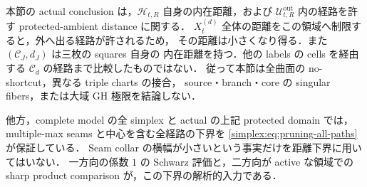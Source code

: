 \begin{remark}[内在距離と大域の距離を区別する]
\label{simplex:rem:closed-corner-metric-scope}
本節の actual conclusion は，$\mathscr H_{t,R}$ 自身の内在距離，および
$\mathscr U_{t,R}^{\mathrm{out}}$ 内の経路を許す protected-ambient distance に関する．
$X_t^{(d)}$ 全体の距離をこの領域へ制限すると，外へ出る経路が許されるため，
その距離は小さくなり得る．また $(\mathcal C_J,d_J)$ は三枚の squares 自身の
内在距離を持つ．他の labels の cells を経由する
$\mathcal C_d$ の経路まで比較したものではない．
従って本節は全曲面の no-shortcut，異なる triple charts の接合，
source・branch・core の singular fibers，または大域 GH 極限を結論しない．

他方，complete model の全 simplex と actual の上記 protected domain では，
multiple-max seams と中心を含む全経路の下界を
\eqref{simplex:eq:pruning-all-paths} が保証している．
Seam collar の横幅が小さいという事実だけを距離下界に用いてはいない．
一方向の係数 $1$ の Schwarz 評価と，二方向が active な領域での
sharp product comparison が，この下界の解析的入力である．
\end{remark}

